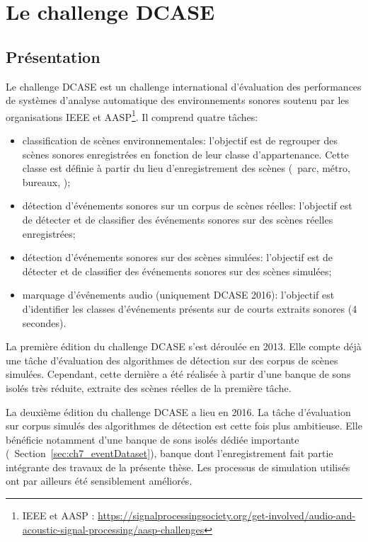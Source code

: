 \section{Le challenge DCASE}
\label{sec:ch6_challengeDcasePresentation}

\subsection{Présentation}

Le challenge DCASE est un challenge international d'évaluation des performances de systèmes d'analyse automatique des environnements sonores soutenu par les organisations IEEE et AASP\footnote{IEEE et AASP : \url{https://signalprocessingsociety.org/get-involved/audio-and-acoustic-signal-processing/aasp-challenges}}. Il comprend quatre tâches:

\begin{itemize}
\item classification de scènes environnementales: l'objectif est de regrouper des scènes sonores enregistrées en fonction de leur classe d'appartenance. Cette classe est définie à partir du lieu d'enregistrement des scènes (\eg~parc, métro, bureaux, \etc);
\item détection d'événements sonores sur un corpus de scènes réelles: l'objectif est de détecter et de classifier des événements sonores sur des scènes réelles enregistrées;
\item détection d'événements sonores sur des scènes simulées: l'objectif est de détecter et de classifier des événements sonores sur des scènes simulées;
\item marquage d'événements audio (uniquement DCASE 2016): l'objectif est d'identifier les classes d'événements présents sur de courts extraits sonores (4 secondes).
\end{itemize}

La première édition du challenge DCASE \citep{Giannoulis2013database, giannoulis2013detection, Stowell15} s'est déroulée en 2013. Elle compte déjà une tâche d'évaluation des algorithmes de détection sur des corpus de scènes simulées. Cependant, cette dernière a été réalisée à partir d'une banque de sons isolés très réduite, extraite des scènes réelles de la première tâche.

La deuxième édition du challenge DCASE a lieu en 2016. La tâche d'évaluation sur corpus simulés des algorithmes de détection est cette fois plus ambitieuse. Elle bénéficie notamment d'une banque de sons isolés dédiée importante (\cf~Section~\ref{sec:ch7_eventDataset}), banque dont l'enregistrement fait partie intégrante des travaux de la présente thèse. Les processus de simulation utilisés ont par ailleurs été sensiblement améliorés.

